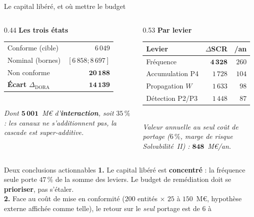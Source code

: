 \documentclass[11pt]{beamer}
\begin{document}
\begin{frame}{Le capital libéré, et où mettre le budget}
\footnotesize
\begin{columns}[t]
\begin{column}{0.44\linewidth}
\centering
\textbf{Les trois états}\\[3pt]
\begin{tabular}{@{}l r@{}}
\toprule
Conforme (cible) & $6\,049$ \\
Nominal (bornes) & $[6\,858;8\,697]$ \\
Non conforme & $\mathbf{20\,188}$ \\
\midrule
\textbf{Écart $\Delta_{\text{DORA}}$} & $\mathbf{14\,139}$ \\
\bottomrule
\end{tabular}\\[5pt]
\emph{Dont $\mathbf{5\,001}$~M\euro{} d'\textbf{interaction}, soit $35\,\%$ : les canaux ne
s'additionnent pas, la cascade est super-additive.}
\end{column}
\begin{column}{0.53\linewidth}
\centering
\textbf{Par levier}\\[3pt]
\begin{tabular}{@{}l r r@{}}
\toprule
\textbf{Levier} & \textbf{$\Delta$SCR} & \textbf{/an} \\
\midrule
Fréquence & $\mathbf{4\,328}$ & $260$ \\
Accumulation P4 & $1\,728$ & $104$ \\
Propagation $W$ & $1\,633$ & $98$ \\
Détection P2/P3 & $1\,448$ & $87$ \\
\bottomrule
\end{tabular}\\[5pt]
\emph{Valeur annuelle au seul coût de portage ($6\,\%$, marge de risque
Solvabilité~II) : $\mathbf{848}$~M\euro/an.}
\end{column}
\end{columns}
\vspace{2mm}
\begin{block}{Deux conclusions actionnables}
\textbf{1.} Le capital libéré est \textbf{concentré} : la fréquence seule porte $47\,\%$ de
la somme des leviers. Le budget de remédiation doit se \textbf{prioriser}, pas s'étaler.\\[3pt]
\textbf{2.} Face au coût de mise en conformité ($200$ entités $\times$ $25$ à $150$~M\euro,
hypothèse externe affichée comme telle), le retour sur le \emph{seul} portage est de $6$ à

\end{block}
\end{frame}
\end{document}
